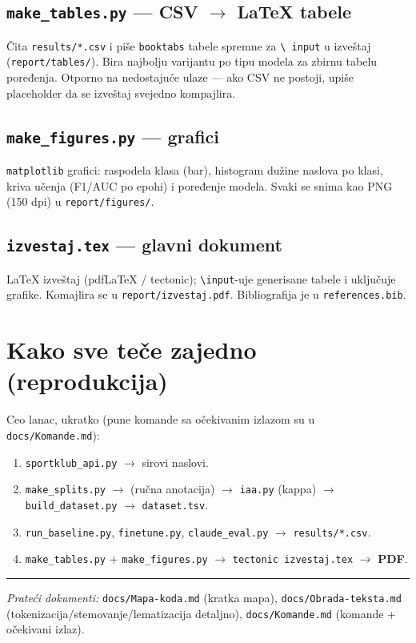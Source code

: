 \documentclass[11pt,a4paper]{article}
\newcommand{\kod}[1]{\texttt{#1}}
\begin{document}
\subsection{\texttt{make\_tables.py} --- CSV $\to$ LaTeX tabele}
Čita \kod{results/*.csv} i piše \kod{booktabs} tabele spremne za \kod{\textbackslash
input} u izveštaj (\kod{report/tables/}). Bira najbolju varijantu po tipu modela za
zbirnu tabelu poređenja. Otporno na nedostajuće ulaze --- ako CSV ne postoji, upiše
placeholder da se izveštaj svejedno kompajlira.

\subsection{\texttt{make\_figures.py} --- grafici}
\kod{matplotlib} grafici: raspodela klasa (bar), histogram dužine naslova po klasi,
kriva učenja (F1/AUC po epohi) i poređenje modela. Svaki se snima kao PNG (150 dpi) u
\kod{report/figures/}.

\subsection{\texttt{izvestaj.tex} --- glavni dokument}
LaTeX izveštaj (pdfLaTeX / tectonic); \kod{\textbackslash input}-uje generisane tabele
i uključuje grafike. Komajlira se u \kod{report/izvestaj.pdf}. Bibliografija je u
\kod{references.bib}.

\section{Kako sve teče zajedno (reprodukcija)}
Ceo lanac, ukratko (pune komande sa očekivanim izlazom su u
\texttt{docs/Komande.md}):
\begin{enumerate}[nosep]
  \item \kod{sportklub\_api.py} $\to$ sirovi naslovi.
  \item \kod{make\_splits.py} $\to$ (ručna anotacija) $\to$ \kod{iaa.py} (kappa) $\to$
    \kod{build\_dataset.py} $\to$ \kod{dataset.tsv}.
  \item \kod{run\_baseline.py}, \kod{finetune.py}, \kod{claude\_eval.py} $\to$
    \kod{results/*.csv}.
  \item \kod{make\_tables.py} + \kod{make\_figures.py} $\to$ \kod{tectonic
    izvestaj.tex} $\to$ \textbf{PDF}.
\end{enumerate}

\vspace{2mm}\hrule\vspace{2mm}
\noindent\textit{Prateći dokumenti:} \texttt{docs/Mapa-koda.md} (kratka mapa),
\texttt{docs/Obrada-teksta.md} (tokenizacija/stemovanje/lematizacija detaljno),
\texttt{docs/Komande.md} (komande + očekivani izlaz).
\end{document}
